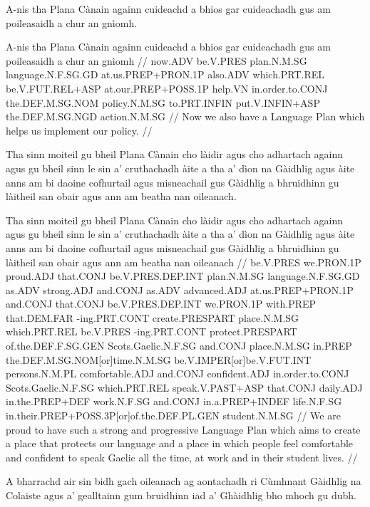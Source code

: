 \documentclass[a4paper,10pt]{article}
\begin{document}
\ex
\begingl
\glpre A-nis tha Plana Cànain againn cuideachd a bhios gar cuideachadh gus am poileasaidh a chur an gnìomh. 

\vspace{4mm}
\gla A-nis tha Plana Cànain againn cuideachd a bhios gar cuideachadh gus am poileasaidh a chur an gnìomh  //
\glb now.ADV be.V.PRES plan.N.M.SG language.N.F.SG.GD at.us.PREP+PRON.1P also.ADV which.PRT.REL be.V.FUT.REL+ASP at.our.PREP+POSS.1P help.VN in.order.to.CONJ the.DEF.M.SG.NOM policy.N.M.SG to.PRT.INFIN put.V.INFIN+ASP the.DEF.M.SG.NGD action.N.M.SG  //
\glft Now we also have a Language Plan which helps us implement our policy. //
\endgl
\xe

\ex
\begingl
\glpre Tha sinn moiteil gu bheil Plana Cànain cho làidir agus cho adhartach againn agus gu bheil sinn le sin a' cruthachadh àite a tha a' dìon na Gàidhlig agus àite anns am bi daoine cofhurtail agus misneachail gus Gàidhlig a bhruidhinn gu làitheil san obair agus ann am beatha nan oileanach. 

\vspace{4mm}
\gla Tha sinn moiteil gu bheil Plana Cànain cho làidir agus cho adhartach againn agus gu bheil sinn le sin a' cruthachadh àite a tha a' dìon na Gàidhlig agus àite anns am bi daoine cofhurtail agus misneachail gus Gàidhlig a bhruidhinn gu làitheil san obair agus {ann am} beatha nan oileanach  //
\glb be.V.PRES we.PRON.1P proud.ADJ that.CONJ be.V.PRES.DEP.INT plan.N.M.SG language.N.F.SG.GD as.ADV strong.ADJ and.CONJ as.ADV advanced.ADJ at.us.PREP+PRON.1P and.CONJ that.CONJ be.V.PRES.DEP.INT we.PRON.1P with.PREP that.DEM.FAR -ing.PRT.CONT create.PRESPART place.N.M.SG which.PRT.REL be.V.PRES -ing.PRT.CONT protect.PRESPART of.the.DEF.F.SG.GEN Scots.Gaelic.N.F.SG and.CONJ place.N.M.SG in.PREP the.DEF.M.SG.NOM[or]time.N.M.SG be.V.IMPER[or]be.V.FUT.INT persons.N.M.PL comfortable.ADJ and.CONJ confident.ADJ in.order.to.CONJ Scots.Gaelic.N.F.SG which.PRT.REL speak.V.PAST+ASP that.CONJ daily.ADJ in.the.PREP+DEF work.N.F.SG and.CONJ in.a.PREP+INDEF life.N.F.SG in.their.PREP+POSS.3P[or]of.the.DEF.PL.GEN student.N.M.SG  //
\glft We are proud to have such a strong and progressive Language Plan which aims to create a place that protects our language and a place in which people feel comfortable and confident to speak Gaelic all the time, at work and in their student lives. //
\endgl
\xe

\ex
\begingl
\glpre A bharrachd air sin bidh gach oileanach ag aontachadh ri Cùmhnant Gàidhlig na Colaiste agus a' gealltainn gum bruidhinn iad a' Ghàidhlig bho mhoch gu dubh. 
\end{document}

